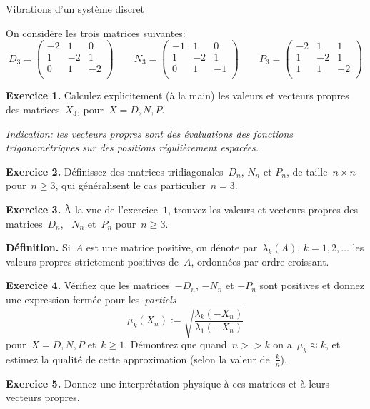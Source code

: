 \documentclass[a4paper,11pt]{article}
\begin{document}
\thispagestyle{empty}

\begin{center}
	\Large Vibrations d'un système discret
\end{center}

On considère les trois matrices suivantes:
\[
	D_3=\begin{pmatrix}
		-2 & 1 & 0 \\
		1 & -2 & 1 \\
		0 & 1 & -2 \\
	\end{pmatrix}
	\qquad
	N_3=\begin{pmatrix}
		-1 & 1 & 0 \\
		1 & -2 & 1 \\
		0 & 1 & -1 \\
	\end{pmatrix}
	\qquad
	P_3=\begin{pmatrix}
		-2 & 1 & 1 \\
		1 & -2 & 1 \\
		1 & 1 & -2 \\
	\end{pmatrix}
\]

{\bf Exercice 1.}
Calculez explicitement (à la main) les valeurs et vecteurs propres des
matrices~$X_3$, pour~$X=D,N,P$.

{\sl Indication: les vecteurs propres sont des évaluations des fonctions
trigonométriques sur des positions régulièrement espacées.}

{\bf Exercice 2.}
Définissez des matrices tridiagonales~$D_n$, $N_n$ et $P_n$, de taille~$n\times
n$ pour~$n\ge 3$, qui généralisent le cas particulier~$n=3$.

{\bf Exercice 3.}
À la vue de l'exercice~$1$, trouvez les valeurs et vecteurs propres des
matrices~$D_n$, ~$N_n$ et~$P_n$ pour~$n\ge 3$.

{\bf Définition.}
Si~$A$ est une matrice positive, on dénote par~$\lambda_k(A)$, $k=1,2,\ldots$
les valeurs propres strictement positives de~$A$, ordonnées par ordre croissant.

{\bf Exercice 4.}
Vérifiez que les matrices~$-D_n$, $-N_n$ et $-P_n$ sont positives et donnez une
expression fermée pour les~\emph{partiels}
\[
	\mu_k(X_n) := \sqrt{\frac{\lambda_k(-X_n)}{\lambda_1(-X_n)}}
\]
pour~$X=D,N,P$ et~$k\ge 1$.  Démontrez que quand~$n>>k$ on a~$\mu_k\approx k$,
et estimez la qualité de cette approximation (selon la valeur de~$\tfrac kn$).

{\bf Exercice 5.}
Donnez une interprétation physique à ces matrices et à leurs vecteurs propres.
\end{document}
